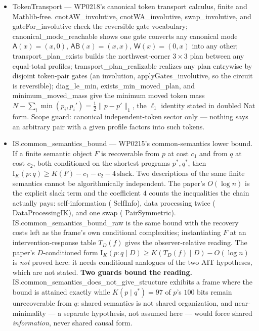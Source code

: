 \documentclass[11pt,a4paper]{article}
\newcommand{\lean}[1]{{\ttfamily\small
  \let\leanunderscore\_\def\_{\leanunderscore\allowbreak}#1}}
\newcommand{\Ik}{\mathrm{I}_K}
\begin{document}
\begin{itemize}[leftmargin=1.4em,itemsep=1pt]
the explicit-error forms.
\item \lean{TokenTransport} --- WP0218's canonical token transport calculus, finite and
Mathlib-free. \lean{cnotAW\_involutive}, \lean{cnotWA\_involutive},
\lean{swap\_involutive}, and \lean{gateFor\_involutive} check the reversible gate
vocabulary; \lean{canonical\_mode\_reachable} shows one gate converts any canonical mode
$\mathsf A(x)=(x,0)$, $\mathsf{AB}(x)=(x,x)$, $\mathsf W(x)=(0,x)$ into any other;
\lean{transport\_plan\_exists} builds the northwest-corner $3\times3$ plan between any
equal-total profiles; \lean{transport\_plan\_realizable} realizes any plan entrywise by
disjoint token-pair gates (an involution, \lean{applyGates\_involutive}, so the circuit
is reversible); \lean{diag\_le\_min}, \lean{exists\_min\_moved\_plan}, and
\lean{minimum\_moved\_mass} give the minimum moved token mass
$N-\sum_i\min(p_i,p_i')=\tfrac12\lVert p-p'\rVert_1$, the $\ell_1$ identity stated in
doubled \lean{Nat} form. Scope guard: canonical independent-token sector only --- nothing
says an arbitrary pair with a given profile factors into such tokens.
\item \lean{IS.common\_semantics\_bound} --- WP0215's common-semantics lower bound. If a finite
semantic object $F$ is recoverable from $p$ at cost $c_1$ and from $q$ at cost $c_2$, both
conditioned on the shortest programs $p^\ast,q^\ast$, then
$\Ik(p{:}q)\ge K(F)-c_1-c_2-4\,\mathrm{slack}$. Two descriptions of the same finite semantics
cannot be algorithmically independent. The paper's $O(\log n)$ is the explicit \lean{slack} term
and the coefficient $4$ counts the inequalities the chain actually pays: self-information
(\lean{SelfInfo}), data processing twice (\lean{DataProcessingIK}), and one swap
(\lean{PairSymmetric}). \lean{IS.common\_semantics\_bound\_raw} is the same bound with the
recovery costs left as the frame's own conditional complexities; instantiating $F$ at an
intervention-response table $T_D(f)$ gives the observer-relative reading. The paper's
$D$-conditioned form $\Ik(p{:}q\mid D)\ge K(T_D(f)\mid D)-O(\log n)$ is \emph{not} proved here:
it needs conditional analogues of the two AIT hypotheses, which are not stated.
\textbf{Two guards bound the reading.}
\lean{IS.common\_semantics\_does\_not\_give\_structure} exhibits a frame where the bound is
attained exactly while $K(p\mid q^\ast)=97$ of $p$'s $100$ bits remain unrecoverable from $q$:
shared semantics is not shared organization, and near-minimality --- a separate hypothesis, not
assumed here --- would force shared \emph{information}, never shared causal form.

\end{itemize}
\end{document}
